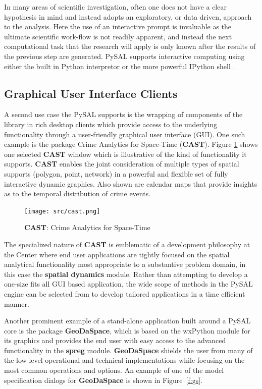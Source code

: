 \documentclass[11pt, titlepage]{amsart}
\begin{document}
In many areas of scientific investigation, often one does not have a
clear hypothesis in mind and instead adopts an exploratory, or data
driven, approach to the analysis. Here the use of an interactive prompt
is invaluable as the ultimate scientific work-flow is not readily
apparent, and instead the next computational task that the research
will apply is only known after the results of the previous step are
generated. PySAL supports interactive computing using either the built
in Python interpretor or the more powerful IPython shell \citep{Perez:2007kq}.

\subsection{Graphical User Interface Clients}

A second use case the PySAL supports is the wrapping of components of
the library in rich desktop clients which provide access to the
underlying functionality through a user-friendly graphical user
interface (GUI). One such example is the package Crime Analytics for
Space-Time (\textbf{CAST}). Figure \ref{f:cast} shows one selected \textbf{CAST} window
which is illustrative of the kind of functionality it supports. \textbf{CAST}
enables the joint consideration of multiple types of spatial supports
(polygon, point, network) in a powerful and flexible set of fully
interactive dynamic graphics. Also shown are calendar maps that provide
insights as to the temporal distribution of crime events.

\begin{figure}[ht]
  \begin{center}
    \texttt{[image: src/cast.png]}
  \end{center}
     \caption{\textbf{CAST}: Crime Analytics for Space-Time}
     \label{f:cast}
      \end{figure}      

The specialized nature of \textbf{CAST} is emblematic of a development philosophy
at the Center where end user applications are tightly focused on the
spatial analytical functionality most appropriate to a substantive
problem domain, in this case the \textbf{spatial dynamics} module.
Rather than attempting to develop a one-size fits all GUI based
application, the wide scope of methods in the PySAL engine can be
selected from to develop tailored applications in a time efficient
manner.

Another prominent example of a stand-alone application built around a
PySAL core is the package \textbf{GeoDaSpace}, which is based on the wxPython
module for its graphics and provides the end user with easy access to the
advanced functionality in the \textbf{spreg} module. \textbf{GeoDaSpace} shields the
user from many of the low level operational and technical
implementations while focusing on the most common operations and
options. An example of one of the model specification dialogs for
\textbf{GeoDaSpace} is shown in Figure~\ref{f:gs}.
\end{document}
